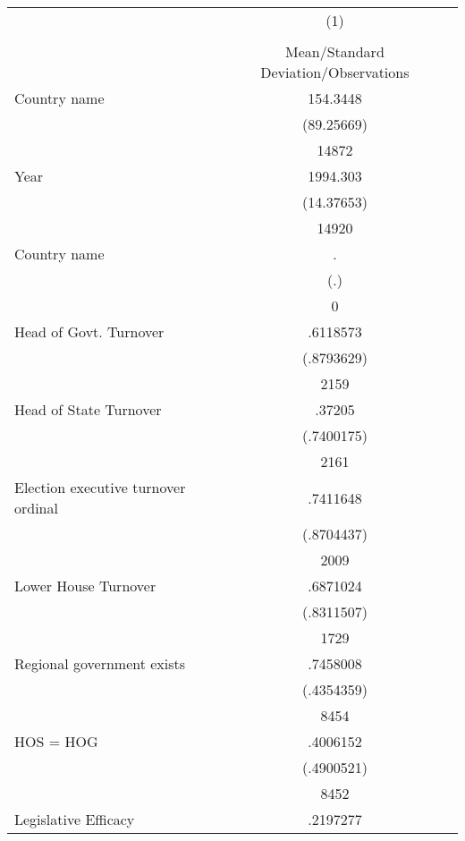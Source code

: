 {
\def\sym#1{\ifmmode^{#1}\else\(^{#1}\)\fi}
\begin{longtable}{l*{1}{c}}
\hline\hline\endfirsthead\hline\endhead\hline\endfoot\endlastfoot
                    &\multicolumn{1}{c}{(1)}\\
                    &\multicolumn{1}{c}{}\\
                    &Mean/Standard Deviation/Observations\\
\hline
Country name        &    154.3448\\
                    &  (89.25669)\\
                    &       14872\\
Year                &    1994.303\\
                    &  (14.37653)\\
                    &       14920\\
Country name        &           .\\
                    &         (.)\\
                    &           0\\
Head of Govt. Turnover&    .6118573\\
                    &  (.8793629)\\
                    &        2159\\
Head of State Turnover&      .37205\\
                    &  (.7400175)\\
                    &        2161\\
Election executive turnover ordinal&    .7411648\\
                    &  (.8704437)\\
                    &        2009\\
Lower House Turnover&    .6871024\\
                    &  (.8311507)\\
                    &        1729\\
Regional government exists   &    .7458008\\
                    &  (.4354359)\\
                    &        8454\\
HOS = HOG           &    .4006152\\
                    &  (.4900521)\\
                    &        8452\\
Legislative Efficacy&    .2197277\\

\end{longtable}}
